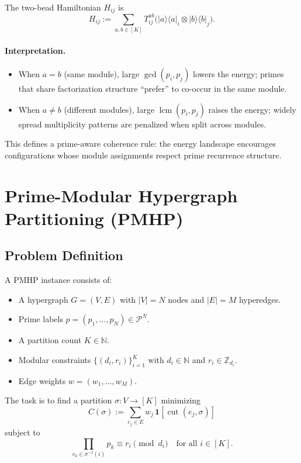 \documentclass[11pt]{article}
\begin{document}
\begin{definition}
The two-bead Hamiltonian $H_{ij}$ is
\[
  H_{ij} := \sum_{a,b\in[K]} T_{ij}^{ab}
    \bigl( |a\rangle\langle a|_i \otimes |b\rangle\langle b|_j \bigr).
\]
\end{definition}

\paragraph{Interpretation.}

\begin{itemize}
  \item When $a=b$ (same module), large $\gcd(p_i,p_j)$ lowers the energy; primes that share factorization structure ``prefer'' to co-occur in the same module.
  \item When $a\neq b$ (different modules), large $\operatorname{lcm}(p_i,p_j)$ raises the energy; widely spread multiplicity patterns are penalized when split across modules.
\end{itemize}

This defines a prime-aware coherence rule: the energy landscape encourages configurations whose module assignments respect prime recurrence structure.

\section{Prime-Modular Hypergraph Partitioning (PMHP)}

\subsection{Problem Definition}

\begin{definition}
A PMHP instance consists of:
\begin{itemize}
  \item A hypergraph $G = (V,E)$ with $|V| = N$ nodes and $|E| = M$ hyperedges.
  \item Prime labels $p = (p_1,\dots,p_N) \in \mathcal{P}^N$.
  \item A partition count $K \in \mathbb{N}$.
  \item Modular constraints $\{(d_i,r_i)\}_{i=1}^K$ with $d_i \in \mathbb{N}$ and $r_i \in \mathbb{Z}_{d_i}$.
  \item Edge weights $w = (w_1,\dots,w_M)$.
\end{itemize}
The task is to find a partition $\sigma:V \to [K]$ minimizing
\[
  C(\sigma) := \sum_{e_j\in E} w_j\,\mathbf{1}[\operatorname{cut}(e_j,\sigma)]
\]
subject to
\[
  \prod_{v_k \in \sigma^{-1}(i)} p_k \equiv r_i \pmod{d_i}
  \quad\text{for all } i \in [K].
\]
\end{definition}
\end{document}
